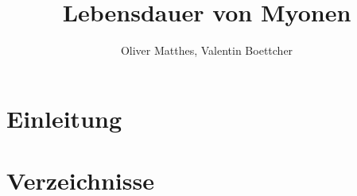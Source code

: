 \documentclass[slug=LM, room=Andreas-Schubert-Bau\,\ K\ 1A,
supervisor=Anne-Sophie\ Berthold, coursedate=13.\ 12.\ 2019]{../../Lab_Report_LaTeX/lab_report}
\title{Lebensdauer von Myonen}
\author{Oliver Matthes, Valentin Boettcher}
\begin{document}
\maketitle

\section{Einleitung}
\label{sec:einl}

\section{Verzeichnisse}

\label{sec:literatur}

\listoffigures

\listoftables

\printbibliography
\end{document}
